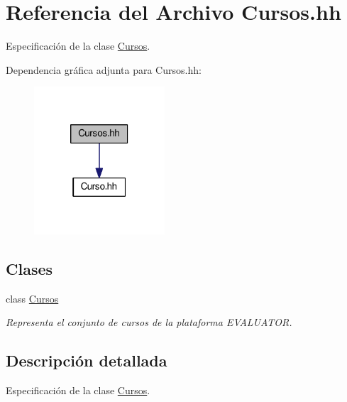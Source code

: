 \hypertarget{_cursos_8hh}{}\section{Referencia del Archivo Cursos.\+hh}
\label{_cursos_8hh}


Especificación de la clase \mbox{\hyperlink{class_cursos}{Cursos}}.  


Dependencia gráfica adjunta para Cursos.\+hh\+:
\nopagebreak
\begin{figure}[H]
\begin{center}
\leavevmode
\includegraphics[width=138pt]{_cursos_8hh__incl}
\end{center}
\end{figure}
\subsection*{Clases}
\begin{DoxyCompactItemize}
\item 
class \mbox{\hyperlink{class_cursos}{Cursos}}
\begin{DoxyCompactList}\small\item\em Representa el conjunto de cursos de la plataforma E\+V\+A\+L\+U\+A\+T\+OR. \end{DoxyCompactList}\end{DoxyCompactItemize}


\subsection{Descripción detallada}
Especificación de la clase \mbox{\hyperlink{class_cursos}{Cursos}}. 

